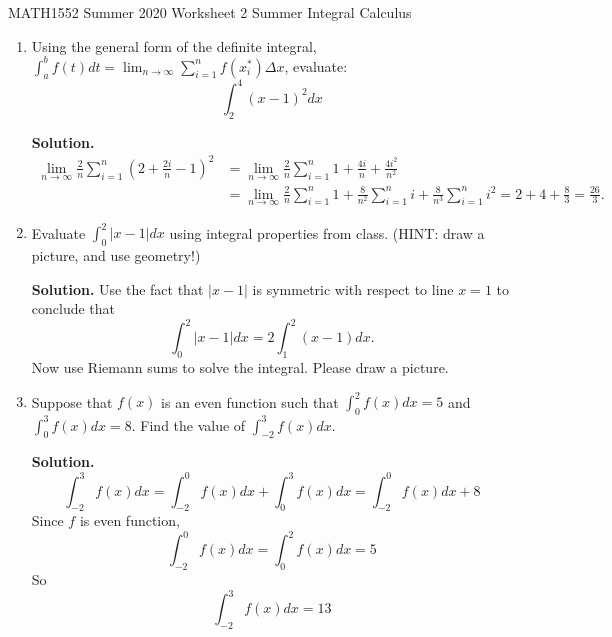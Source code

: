 \documentclass[12pt]{article}
\begin{document}
\noindent
MATH1552 Summer 2020
\hspace{2.2cm}
Worksheet 2 Summer
\hspace{2cm} Integral Calculus

\vspace{2mm}


\begin{enumerate}
 \item  Using the general form of the definite integral, $\int_{a}^b f(t)dt = \lim_{n\rightarrow \infty}\sum_{i=1}^n f(x_i^*)\Delta x$, evaluate:
$$\int_{2}^4 (x-1)^2dx$$

\textbf{Solution. }
\begin{align*}
 \lim_{n\rightarrow \infty}\frac{2}{n}\sum_{i=1}^n (2+\frac{2i}{n}-1)^2 &= \lim_{n\rightarrow \infty}\frac{2}{n}\sum_{i=1}^n 1+\frac{4i}{n}+\frac{4i^2}{n^2} \nonumber\\
&=  \lim_{n\rightarrow \infty}\frac{2}{n}\sum_{i=1}^n 1 +\frac{8}{n^2}\sum_{i=1}^n i + \frac{8}{n^3}\sum_{i=1}^n i^2 = 2+4+\frac{8}{3}=\frac{26}{3}.
\end{align*}



\item Evaluate $\int_0^2 |x-1|dx$  using integral properties from class. (HINT: draw a picture, and
use geometry!)

\textbf{Solution.} Use the fact that $|x-1|$ is symmetric with respect to line $x=1$ to conclude that
$$\int_0^2 |x-1|dx = 2\int_1^2 (x-1)dx.$$ 
Now use Riemann sums to solve the integral. Please draw a picture.

\item Suppose that $f(x)$ is an even function such that $\int_0^2 f(x)dx =5$ and $\int_0^3 f(x)dx=8$. Find the value of $\int_{-2}^3f(x)dx$.

\textbf{Solution. }
$$\int_{-2}^3f(x)dx = \int_{-2}^0f(x)dx+\int_{0}^3f(x)dx = \int_{-2}^0f(x)dx+8$$
Since $f$ is even function, 
$$ \int_{-2}^0f(x)dx =  \int_{0}^2f(x)dx =5$$
So
$$\int_{-2}^3f(x)dx =13$$

\end{enumerate}
\end{document}
